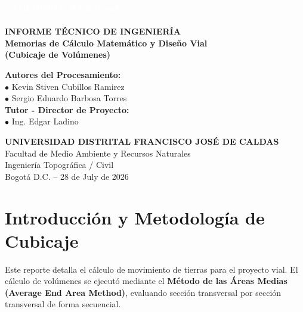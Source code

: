 \documentclass[11pt,letterpaper]{article}
\begin{document}
\begin{titlepage}
\vspace*{-2cm}
\begin{center}
  \textcolor{white}{\Huge \textbf{GEOPORTAL WEB (GeoPol)}} \\[0.5cm]
  \textcolor{white}{\large \textit{''Máxima precisión al alcance de tus manos''}} \\[2cm]
  \vspace{3cm}
  {\LARGE \textbf{INFORME TÉCNICO DE INGENIERÍA}} \\[0.5cm]
  {\Large \textbf{Memorias de Cálculo Matemático y Diseño Vial\\ (Cubicaje de Volúmenes)}} \\[2cm]
  \begin{flushleft}
    \Large \textbf{Autores del Procesamiento:}\\[0.2cm]
    \large $\bullet$ Kevin Stiven Cubillos Ramirez \\[0.1cm]
    \large $\bullet$ Sergio Eduardo Barbosa Torres \\[0.1cm]
    \vspace{1cm}
    \Large \textbf{Tutor - Director de Proyecto:}\\[0.2cm]
    \large $\bullet$ Ing. Edgar Ladino
  \end{flushleft}
  \vfill
  \textbf{UNIVERSIDAD DISTRITAL FRANCISCO JOSÉ DE CALDAS}\\[0.2cm]
  Facultad de Medio Ambiente y Recursos Naturales \\ Ingeniería Topográfica / Civil \\[0.2cm]
  Bogotá D.C. -- 28 de July de 2026
\end{center}
\end{titlepage}
\tableofcontents
\newpage
\section{Introducción y Metodología de Cubicaje}
Este reporte detalla el cálculo de movimiento de tierras para el proyecto vial. El cálculo de volúmenes se ejecutó mediante el \textbf{Método de las Áreas Medias (Average End Area Method)}, evaluando sección transversal por sección transversal de forma secuencial.
\end{document}
